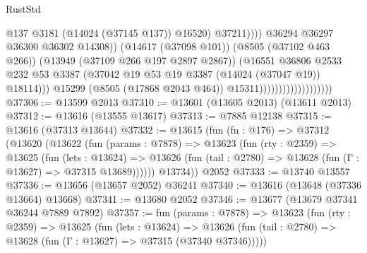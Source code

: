 \begin{lexlean}{RustStd}
\begin{coremodule}
                                                          @137
                                                          @3181
                                                          (@14024 (@37145 @137))
                                                          @16520)
                                                        @37211))))
                                                @36294
                                                @36297
                                                @36300
                                                @36302
                                                @14308))
                                            (@14617 (@37098 @101))
                                            (@8505 (@37102 @463 @266))
                                            (@13949 (@37109 @266 @197 @2897 @2867))
                                            (@16551
                                              @36806
                                              @2533
                                              @232
                                              @53
                                              @3387
                                              (@37042
                                                @19
                                                @53
                                                @19
                                                @3387
                                                (@14024 (@37047 @19))
                                                @18114)))
                                          @15299
                                          (@8505 (@17868 @2043 @464))
                                          @15311)))))))))))))))))))
@37306 := @13599 @2013
@37310 := @13601 (@13605 @2013) (@13611 @2013)
@37312 := @13616 (@13555 @13617)
@37313 := @7885 @12138
@37315 := @13616 (@37313 @13644)
@37332 := @13615
    (fun (fn : @176) =>
    @37312
      (@13620
        (@13622
          (fun (params : @7878) =>
          @13623
            (fun (rty : @2359) =>
            @13625
              (fun (lets : @13624) =>
              @13626 (fun (tail : @2780) => @13628 (fun (Γ : @13627) => @37315 @13689))))))
        @13734))
    @2052
@37333 := @13740 @13557
@37336 := @13656 (@13657 @2052) @36241
@37340 := @13616 (@13648 (@37336 @13664) @13668)
@37341 := @13680 @2052
@37346 := @13677 (@13679 @37341 @36244 @7889 @7892)
@37357 := fun (params : @7878) =>
  @13623
    (fun (rty : @2359) =>
    @13625
      (fun (lets : @13624) =>
      @13626 (fun (tail : @2780) => @13628 (fun (Γ : @13627) => @37315 (@37340 @37346)))))

\end{coremodule}
\end{lexlean}
